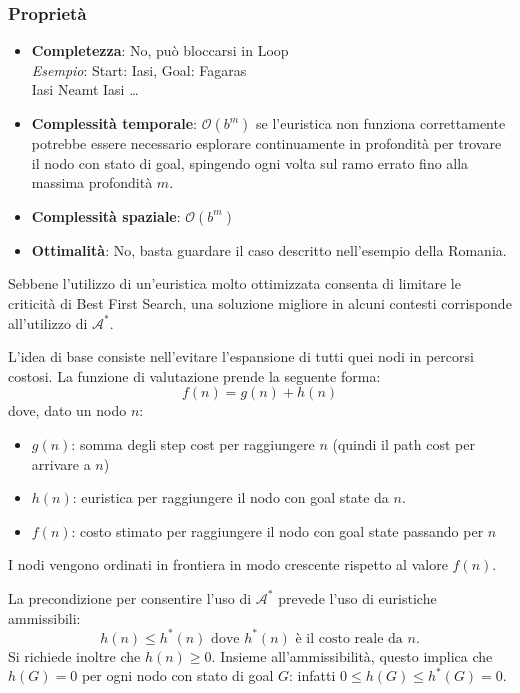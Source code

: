 \documentclass[a4paper, 11pt, oneside]{book}
\theoremstyle{definition}
\begin{document}
	\subsubsection*{Propriet\`a}
	\begin{itemize}
		\item \textbf{Completezza}: No, pu\`o bloccarsi in Loop\\
            \emph{Esempio}: Start: Iasi, Goal: Fagaras\\
            Iasi \rightarrow\space  Neamt \rightarrow\space Iasi \rightarrow\space \dots

        \item \textbf{Complessit\`a temporale}: $\mathcal{O}(b^m)$ se l'euristica non funziona
            correttamente potrebbe essere necessario esplorare continuamente 
            in profondit\`a per trovare il nodo con stato di goal, spingendo ogni volta 
            sul ramo errato fino alla massima profondit\`a $m$.

		\item \textbf{Complessit\`a spaziale}: $\mathcal{O}(b^m)$

		\item \textbf{Ottimalit\`a}: No, basta guardare il caso descritto nell'esempio della 
            Romania.
	\end{itemize}

    Sebbene l'utilizzo di un'euristica molto ottimizzata consenta di limitare le criticit\`a
    di Best First Search, una soluzione migliore in alcuni contesti corrisponde all'utilizzo
    di $\mathcal{A}^*$.
    
    L'idea di base consiste nell'evitare l'espansione di tutti quei nodi in percorsi costosi.
    La funzione di valutazione prende la seguente forma:
    \[
        f(n) = g(n) + h(n)
    \]
    dove, dato un nodo $n$:
    \begin{itemize}
        \item $g(n)$: somma degli step cost per raggiungere $n$ (quindi il path cost per 
            arrivare a $n$)
        \item $h(n)$: euristica per raggiungere il nodo con goal state da $n$.
        \item $f(n)$: costo stimato per raggiungere il nodo con goal state passando per $n$
    \end{itemize}
    I nodi vengono ordinati in frontiera in modo crescente rispetto al valore $f(n)$.

    La precondizione per consentire l'uso di $\mathcal{A}^*$ prevede l'uso di euristiche
    ammissibili:
    \begin{displaymath}
        h(n) \leq h^*(n) \text{ dove } h^*(n) \text{ \`e il costo reale da } n.
    \end{displaymath}
    Si richiede inoltre che $h(n) \geq 0$. Insieme all'ammissibilit\`a, questo implica che
    $h(G) = 0$ per ogni nodo con stato di goal $G$: infatti $0 \leq h(G) \leq h^*(G) = 0$.
\end{document}
